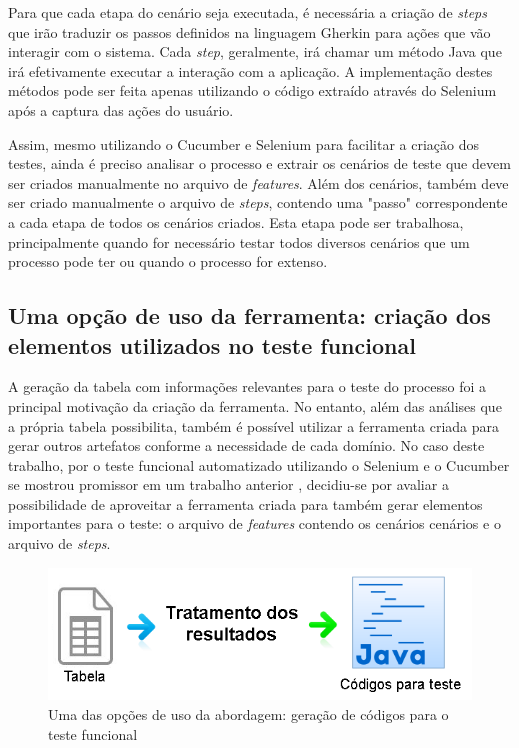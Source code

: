 \documentclass[12pt]{article}
\begin{document}
Para que cada etapa do cenário seja executada, é necessária a criação de \emph{steps} que irão traduzir os passos definidos na linguagem Gherkin para ações que vão interagir com o sistema. Cada \emph{step}, geralmente, irá chamar um método Java que irá efetivamente executar a interação com a aplicação. A implementação destes métodos pode ser feita apenas utilizando o código extraído através do Selenium após a captura das ações do usuário.

Assim, mesmo utilizando o Cucumber e Selenium para facilitar a criação dos testes, ainda é preciso analisar o processo e extrair os cenários de teste que devem ser criados manualmente no arquivo de \emph{features}. Além dos cenários, também deve ser criado manualmente o arquivo de \emph{steps}, contendo uma "passo" correspondente a cada etapa de todos os cenários criados. Esta etapa pode ser trabalhosa, principalmente quando for necessário testar todos diversos cenários que um processo pode ter ou quando o processo for extenso.

\subsection{Uma opção de uso da ferramenta: criação dos elementos utilizados no teste funcional}
A geração da tabela com informações relevantes para o teste do processo foi a principal motivação da criação da ferramenta. No entanto, além das análises que a própria tabela possibilita, também é possível utilizar a ferramenta criada para gerar outros artefatos conforme a necessidade de cada domínio. No caso deste trabalho, por o teste funcional automatizado utilizando o Selenium e o Cucumber se mostrou promissor em um trabalho anterior \cite{sbqs2015}, decidiu-se por avaliar a possibilidade de aproveitar a ferramenta criada para também gerar elementos importantes para o teste: o arquivo de \emph{features} contendo os cenários cenários e o arquivo de \emph{steps}.

\begin{figure}[ht]
\centering
\includegraphics[width=.9\textwidth]{figuras/abordagem2.png}
\caption{Uma das opções de uso da abordagem: geração de códigos para o teste funcional}
\label{fig:abordagem2}
\end{figure}
\end{document}
